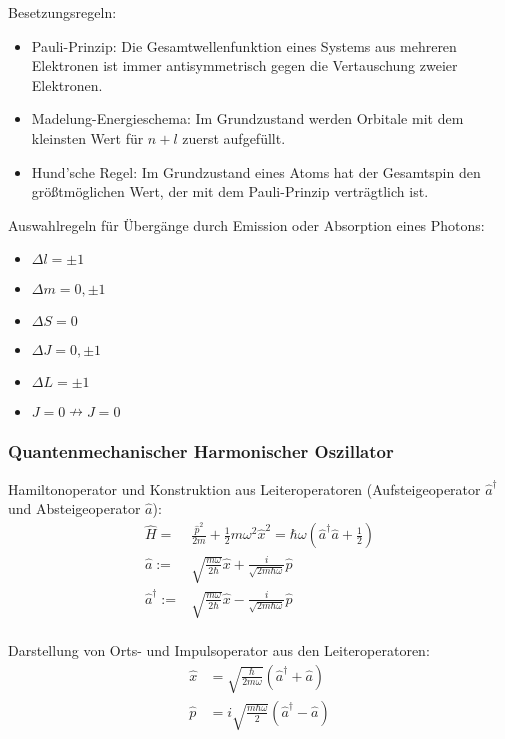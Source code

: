 \documentclass[11pt]{article}
\numberwithin{equation}{section}
\begin{document}
        Besetzungsregeln:
        \begin{itemize}
          \item Pauli-Prinzip: Die Gesamtwellenfunktion eines Systems aus mehreren Elektronen ist immer antisymmetrisch  gegen die Vertauschung zweier Elektronen.
          \item Madelung-Energieschema: Im Grundzustand werden Orbitale mit dem kleinsten Wert für $n+l$ zuerst aufgefüllt.
          \item Hund'sche Regel: Im Grundzustand eines Atoms hat der Gesamtspin den größtmöglichen Wert, der mit dem Pauli-Prinzip verträgtlich ist.
        \end{itemize}

        Auswahlregeln für Übergänge durch Emission oder Absorption eines Photons:
        \begin{itemize}
          \item $\Delta l = \pm 1$
          \item $\Delta m = 0, \pm 1$
          \item $\Delta S = 0$
          \item $\Delta J = 0, \pm 1$
          \item $\Delta L = \pm 1$
          \item $J=0 \nrightarrow J=0$
        \end{itemize}

      \subsubsection{Quantenmechanischer Harmonischer Oszillator}
        Hamiltonoperator und Konstruktion aus Leiteroperatoren (Aufsteigeoperator $\hat{a}^\dagger$ und Absteigeoperator $\hat{a}$):
        \begin{equation}
          \begin{aligned}
            \hat{H} =& \frac{\hat{p}^2}{2m} + \frac{1}{2}m\omega^2 \hat{x}^2 = \hbar\omega(\hat{a}^\dagger \hat{a} + \frac{1}{2}) \\
            \hat{a} :=& \sqrt{\frac{m\omega}{2\hbar}}\hat{x} + \frac{i}{\sqrt{2m\hbar\omega}}\hat{p} \\
            \hat{a}^\dagger :=& \sqrt{\frac{m\omega}{2\hbar}}\hat{x} - \frac{i}{\sqrt{2m\hbar\omega}}\hat{p} \\
          \end{aligned}
        \end{equation}

        Darstellung von Orts- und Impulsoperator aus den Leiteroperatoren:
        \begin{equation}
          \begin{aligned}
            \hat{x} &= \sqrt{\frac{\hbar}{2m\omega}}\left(\hat{a}^\dagger + \hat{a} \right) \\
            \hat{p} &= i\sqrt{\frac{m\hbar\omega}{2}}\left(\hat{a}^\dagger - \hat{a} \right) \\
          \end{aligned}
        \end{equation}
\end{document}
